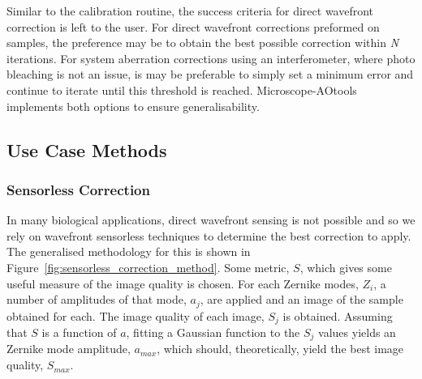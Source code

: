 Similar to the calibration routine, the success criteria for direct wavefront correction is left to the user. For direct wavefront corrections preformed on samples, the preference may be to obtain the best possible correction within \textit{N} iterations. For system aberration corrections using an interferometer, where photo bleaching is not an issue, is may be preferable to simply set a minimum error and continue to iterate until this threshold is reached. Microscope-AOtools implements both options to ensure generalisability.



\subsection{Use Case Methods}
\label{subsec:use_case_methods}

\subsubsection{Sensorless Correction}
\label{subsubsec:sensorless_correction}

In many biological applications, direct wavefront sensing is not possible and so we rely on wavefront sensorless techniques to determine the best correction to apply. The generalised methodology for this is shown in Figure~\ref{fig:sensorless_correction_method}. Some metric, $S$, which gives some useful measure of the image quality is chosen. For each Zernike modes, $Z_{i}$, a number of amplitudes of that mode, $a_{j}$, are applied and an image of the sample obtained for each. The image quality of each image, $S_{j}$ is obtained. Assuming that $S$ is a function of $a$, fitting a Gaussian function to the $S_{j}$ values yields an Zernike mode amplitude, $a_{max}$, which should, theoretically, yield the best image quality, $S_{max}$. 

